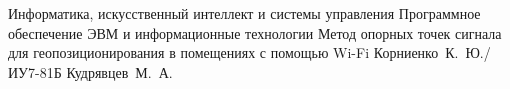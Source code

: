 \documentclass{bmstu}
\begin{document}
\makethesistitle
    {Информатика, искусственный интеллект и системы управления} %
    {Программное обеспечение ЭВМ и информационные технологии} %
    {Метод опорных точек сигнала для геопозиционирования в помещениях с помощью Wi-Fi} %
    {Корниенко~К.~Ю./ИУ7-81Б} %
    {Кудрявцев~М.~А.} %
    {} %
    {} %



\maketableofcontents











\makebibliography


\end{document}
